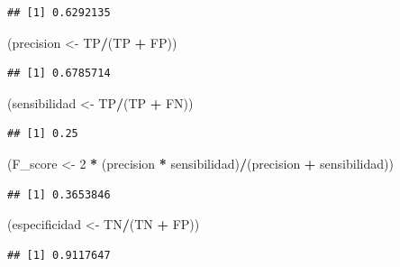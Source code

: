 \documentclass[
  12pt,
]{book}
\newenvironment{Shaded}{\begin{snugshade}}{\end{snugshade}}
\newcommand{\DecValTok}[1]{\textcolor[rgb]{0.00,0.00,0.81}{#1}}
\newcommand{\NormalTok}[1]{#1}
\newcommand{\OperatorTok}[1]{\textcolor[rgb]{0.81,0.36,0.00}{\textbf{#1}}}
\newcommand{\StringTok}[1]{\textcolor[rgb]{0.31,0.60,0.02}{#1}}
\theoremstyle{definition}
\theoremstyle{definition}
\theoremstyle{definition}
\theoremstyle{remark}
\begin{document}
\begin{verbatim}
## [1] 0.6292135
\end{verbatim}

\begin{Shaded}
\begin{Highlighting}[]
\NormalTok{(precision <-}\StringTok{ }\NormalTok{TP}\OperatorTok{/}\NormalTok{(TP }\OperatorTok{+}\StringTok{ }\NormalTok{FP))}
\end{Highlighting}
\end{Shaded}

\begin{verbatim}
## [1] 0.6785714
\end{verbatim}

\begin{Shaded}
\begin{Highlighting}[]
\NormalTok{(sensibilidad <-}\StringTok{ }\NormalTok{TP}\OperatorTok{/}\NormalTok{(TP }\OperatorTok{+}\StringTok{ }\NormalTok{FN))}
\end{Highlighting}
\end{Shaded}

\begin{verbatim}
## [1] 0.25
\end{verbatim}

\begin{Shaded}
\begin{Highlighting}[]
\NormalTok{(F_score <-}\StringTok{ }\DecValTok{2} \OperatorTok{*}\StringTok{ }\NormalTok{(precision }\OperatorTok{*}\StringTok{ }\NormalTok{sensibilidad)}\OperatorTok{/}\NormalTok{(precision }\OperatorTok{+}\StringTok{ }
\StringTok{    }\NormalTok{sensibilidad))}
\end{Highlighting}
\end{Shaded}

\begin{verbatim}
## [1] 0.3653846
\end{verbatim}

\begin{Shaded}
\begin{Highlighting}[]
\NormalTok{(especificidad <-}\StringTok{ }\NormalTok{TN}\OperatorTok{/}\NormalTok{(TN }\OperatorTok{+}\StringTok{ }\NormalTok{FP))}
\end{Highlighting}
\end{Shaded}

\begin{verbatim}
## [1] 0.9117647
\end{verbatim}
\end{document}
